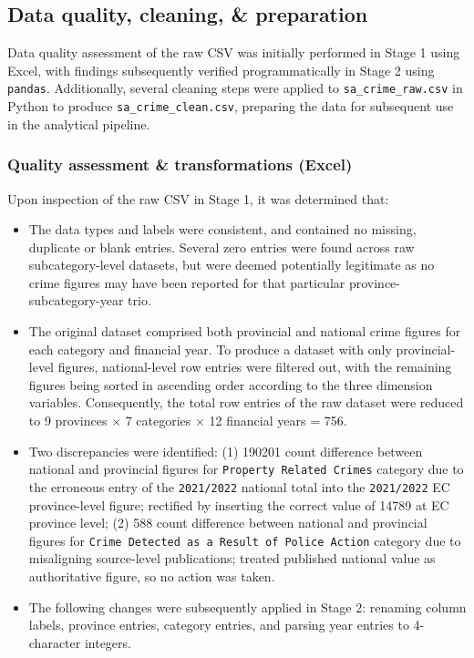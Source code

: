 \documentclass[titlepage, 12pt, oneside]{article}
\numberwithin{equation}{section}
\begin{document}
	\subsection{Data quality, cleaning, \& preparation} \label{data_cleaning}
	Data quality assessment of the raw CSV was initially performed in Stage 1 using Excel, with findings subsequently verified programmatically in Stage 2 using \texttt{pandas}. Additionally, several cleaning steps were applied to \texttt{sa{\_}crime{\_}raw.csv} in Python to produce \texttt{sa{\_}crime{\_}clean.csv}, preparing the data for subsequent use in the analytical pipeline. 
	\subsubsection*{Quality assessment \& transformations (Excel)}
	Upon inspection of the raw CSV in Stage 1, it was determined that:
	\begin{itemize}[leftmargin=*]
		\item The data types and labels were consistent, and contained no missing, duplicate or blank entries. Several zero entries were found across raw subcategory-level datasets, but were deemed potentially legitimate as no crime figures may have been reported for that particular province-subcategory-year trio.   
		\item The original dataset comprised both provincial and national crime figures for each category and financial year. To produce a dataset with only provincial-level figures, national-level row entries were filtered out, with the remaining figures being sorted in ascending order according to the three dimension variables. Consequently, the total row entries of the raw dataset were reduced to 9 provinces $\times$ 7 categories $\times$ 12 financial years = 756.
		\item Two discrepancies were identified: (1) 190201 count difference between national and provincial figures for \texttt{Property Related Crimes} category due to the erroneous entry of the \texttt{2021/2022} national total into the \texttt{2021/2022} EC province-level figure; rectified by inserting the correct value of 14789 at EC province level; (2) 588 count difference between national and provincial figures for \texttt{Crime Detected as a Result of Police Action} category due to misaligning source-level publications; treated published national value as authoritative figure, so no action was taken.
		\item The following changes were subsequently applied in Stage 2: renaming column labels, province entries, category entries, and parsing year entries to 4-character integers.
	\end{itemize}
	
\end{document}
